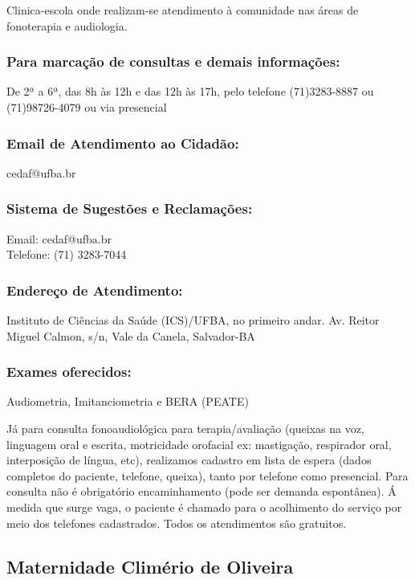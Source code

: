      Clinica-escola onde realizam-se atendimento à comunidade nas áreas de fonoterapia e audiologia.

    \subsubsection{Para marcação de consultas e demais informações:}
            De 2ª a 6ª, das 8h às 12h e das 12h às 17h, pelo telefone (71)3283-8887 ou (71)98726-4079 ou via presencial

    \subsubsection{Email de Atendimento ao Cidadão:}
            cedaf@ufba.br
    
    \subsubsection{Sistema de Sugestões e Reclamações:}
            Email: cedaf@ufba.br \\ Telefone: (71) 3283-7044

    \subsubsection{Endereço de Atendimento:}
            Instituto de Ciências da Saúde (ICS)/UFBA, no primeiro andar. Av. Reitor Miguel Calmon, s/n, Vale da Canela, Salvador-BA
            
    \subsubsection{Exames oferecidos:}
            Audiometria, Imitanciometria e BERA (PEATE)

    \begin{remark}
            Já para consulta fonoaudiológica para terapia/avaliação (queixas na voz, linguagem oral e escrita,
            motricidade orofacial ex:
            mastigação, respirador oral, interposição de língua, etc), realizamos cadastro em
            lista de espera (dados completos do paciente, telefone, queixa), tanto por telefone como presencial. Para
            consulta não é obrigatório encaminhamento (pode ser demanda espontânea). Á medida que surge vaga,
            o paciente é chamado para o acolhimento do serviço por meio dos telefones cadastrados. Todos os atendimentos são
            gratuitos.
    \end{remark}
    \subsection{Maternidade Climério de Oliveira}
    
